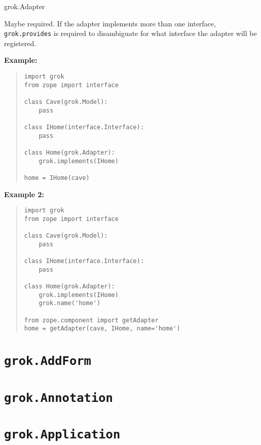 \documentclass[10pt,a4paper,english]{manual}
\begin{document}
\begin{classdesc*}{grok.Adapter}
\begin{description}
Maybe required. If the adapter implements more than one interface,
\texttt{grok.provides} is required to disambiguate for what interface the adapter
will be registered.

\end{description}

\textbf{Example:}
\begin{quote}\begin{verbatim}
import grok
from zope import interface

class Cave(grok.Model):
    pass

class IHome(interface.Interface):
    pass

class Home(grok.Adapter):
    grok.implements(IHome)

home = IHome(cave)
\end{verbatim}\end{quote}

\textbf{Example 2:}
\begin{quote}\begin{verbatim}
import grok
from zope import interface

class Cave(grok.Model):
    pass

class IHome(interface.Interface):
    pass

class Home(grok.Adapter):
    grok.implements(IHome)
    grok.name('home')

from zope.component import getAdapter
home = getAdapter(cave, IHome, name='home')
\end{verbatim}\end{quote}
\end{classdesc*}



\section{\texttt{grok.AddForm}}



\section{\texttt{grok.Annotation}}



\section{\texttt{grok.Application}}
\end{document}

